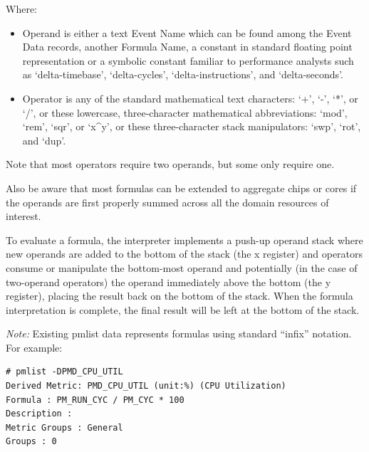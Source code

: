 \documentclass[14]{article}
\begin{document}
Where:
\begin{itemize}
\item Operand is either a text Event Name which can be found among the Event
  Data records, another Formula Name, a constant in standard floating point
  representation or a symbolic constant familiar to performance analysts such as
  `delta-timebase', `delta-cycles', `delta-instructions', and `delta-seconds'.
\item Operator is any of the standard mathematical text characters: `+', `-',
  `*', or `/', or these lowercase, three-character mathematical abbreviations:
  `mod', `rem', `sqr', or `x\^{}y', or these three-character stack manipulators:
  `swp', `rot', and `dup'.

\end{itemize}
Note that most operators require two operands, but some only require one.

Also be aware that most formulas can be extended to aggregate chips or cores if
the operands are first properly summed across all the domain resources of
interest.

To evaluate a formula, the interpreter implements a push-up operand stack where
new operands are added to the bottom of the stack (the x register) and operators
consume or manipulate the bottom-most operand and potentially (in the case of
two-operand operators) the operand immediately above the bottom (the y
register), placing the result back on the bottom of the stack. When the formula
interpretation is complete, the final result will be left at the bottom of the
stack.

\textit{Note:} Existing pmlist data represents formulas using standard ``infix''
notation. For example:

\begin{verbatim}
# pmlist -DPMD_CPU_UTIL
Derived Metric: PMD_CPU_UTIL (unit:%) (CPU Utilization)
Formula : PM_RUN_CYC / PM_CYC * 100
Description :
Metric Groups : General
Groups : 0
\end{verbatim}
\end{document}
